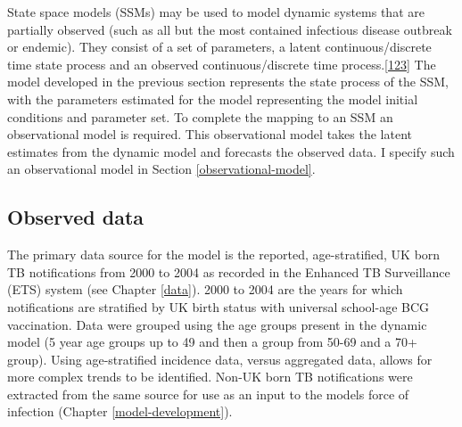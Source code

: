 \documentclass[11pt,twoside]{bristolthesis}
\begin{document}
  State space models (SSMs) may be used to model dynamic systems that are partially observed (such as all but the most contained infectious disease outbreak or endemic). They consist of a set of parameters, a latent continuous/discrete time state process and an observed continuous/discrete time process.{[}\protect\hyperlink{ref-Murray2015}{123}{]} The model developed in the previous section represents the state process of the SSM, with the parameters estimated for the model representing the model initial conditions and parameter set. To complete the mapping to an SSM an observational model is required. This observational model takes the latent estimates from the dynamic model and forecasts the observed data. I specify such an observational model in Section \ref{observational-model}.
  
  \hypertarget{observed-data}{%
  \subsection{Observed data}\label{observed-data}}
  
  The primary data source for the model is the reported, age-stratified, UK born TB notifications from 2000 to 2004 as recorded in the Enhanced TB Surveillance (ETS) system (see Chapter \ref{data}). 2000 to 2004 are the years for which notifications are stratified by UK birth status with universal school-age BCG vaccination. Data were grouped using the age groups present in the dynamic model (5 year age groups up to 49 and then a group from 50-69 and a 70+ group). Using age-stratified incidence data, versus aggregated data, allows for more complex trends to be identified. Non-UK born TB notifications were extracted from the same source for use as an input to the models force of infection (Chapter \ref{model-development}).
  
\end{document}
